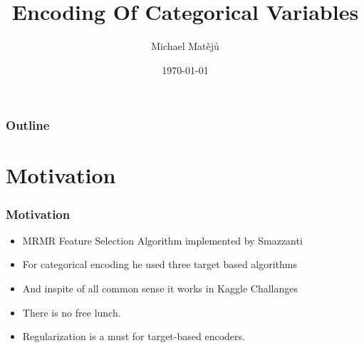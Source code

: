 \documentclass{beamer}
\title{Encoding Of Categorical Variables}
\author{Michael Mat\v{e}j\r{u}}
\institute[KB]{AI Squad}
\date{\today}
\begin{document}
    \begin{frame}
        \titlepage
    \end{frame}

    \begin{frame}
        \frametitle{Outline}
        \tableofcontents
    \end{frame}


    \section{Motivation}
    \begin{frame}
        \frametitle{Motivation}
        \begin{itemize}
            \item MRMR Feature Selection Algorithm implemented by Smazzanti
            \pause
            \item For categorical encoding he used three target based algorithms
            \pause
            \item And inspite of all common sense it works in Kaggle Challanges
            \pause
            \item There is no free lunch.
            \pause
            \item Regularization is a must for target-based encoders.
        \end{itemize}
    \end{frame}
\end{document}
